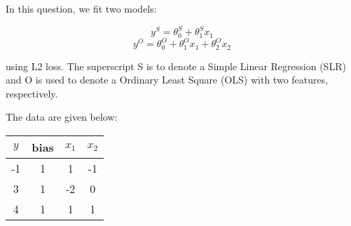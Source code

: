 \documentclass[addpoints, 12pt]{exam}
\theoremstyle{definition}
\newtheorem*{answer}{Answer}
\begin{document}
\begin{questions}
\newpage
{}

\vspace{-1em}

\question[12]
In this question, we fit two models:

$$y^{S} = \theta_0^{S} + \theta_1^{S} x_1$$
$$y^{O} = \theta_0^{O} + \theta_1^{O} x_1 +  \theta_2^{O} x_2$$

using L2 loss. The superscript S is to denote a Simple Linear Regression (SLR) and O is used to denote a Ordinary Least Square (OLS) with two features, respectively. 

The data are given below:

\begin{table}[h]
    \centering
    \begin{tabular}{|c|c|c|c|}
        \hline
        $y$ & bias & $x_1$ & $x_2$ \\
        \hline
        -1 & 1 & 1 & -1\\
        3 & 1 & -2 & 0\\
        4 & 1 & 1 & 1\\
        \hline
    \end{tabular}
\end{table}

\end{questions}
\end{document}
